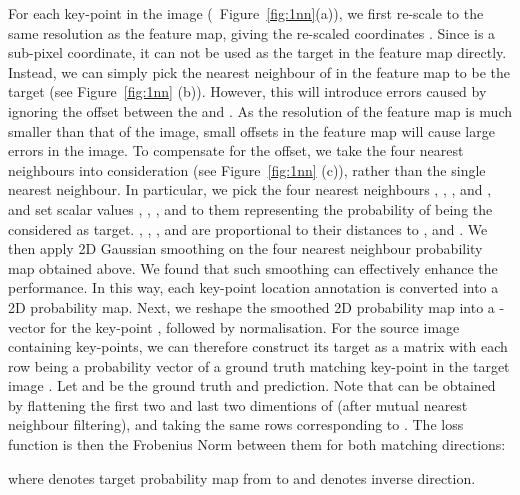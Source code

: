 \documentclass[10pt,twocolumn,letterpaper]{article}
\begin{document}
For each key-point  in the image (\eg~Figure~\ref{fig:1nn}(a)), 
we first re-scale  to the same resolution as the feature map, giving the re-scaled coordinates .
Since  is a sub-pixel coordinate, it can not be used as the target in the feature map directly.
Instead, we can simply pick the nearest neighbour  of  in the feature map to be the target (see Figure~\ref{fig:1nn} (b)).
However, this will introduce errors caused by ignoring the offset between the  and .
As the resolution of the feature map is much smaller than that of the image, small offsets in the feature map will cause large errors in the image.
To compensate for the offset, we take the four nearest neighbours into consideration (see Figure~\ref{fig:1nn} (c)), rather than the single nearest neighbour.
In particular, we pick the four nearest neighbours ,  ,  , and  , and set scalar values , , , and  to them representing the probability of being the considered as target.
, , , and  are proportional to their distances to , and . We then apply 2D Gaussian smoothing on the four nearest neighbour probability map obtained above. We found that such smoothing can effectively enhance the performance.
In this way, each key-point location annotation is converted into a 2D probability map. Next, we reshape the smoothed 2D probability map into a -vector for the key-point , followed by  normalisation.
For the source image  containing  key-points, we can therefore construct its target as a matrix  with each row being a probability vector of a ground truth matching key-point in the target image . Let  and  be the ground truth and prediction. Note that  can be obtained by flattening the first two and last two dimentions of  (after mutual nearest neighbour filtering), and taking the same  rows corresponding to . The loss function is then the Frobenius Norm between them for both matching directions:



where  denotes target probability map from  to  and  denotes inverse direction. 
\end{document}
